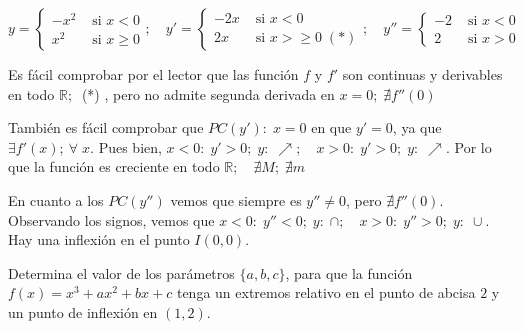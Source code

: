 	\begin{proofw}\renewcommand{\qedsymbol}{$\diamond$}
	
	$y=\begin{cases}	
	 -x^2 & \mbox{ si } x<0 \\
	 x^2	& \mbox{ si } x\ge 0
	\end{cases}; \quad 
	y'=\begin{cases}	
	 -2x & \mbox{ si } x<0 \\
	 2x	& \mbox{ si } x>\ge 0 \; (*)
	\end{cases}; \quad
	y''=\begin{cases}	
	 -2 & \mbox{ si } x<0 \\
	 2	& \mbox{ si } x>0
	\end{cases}$
	
	Es fácil comprobar por el lector que las función $f$ y $f'$ son continuas y derivables en todo $\mathbb R;\ $ (*) , pero no admite segunda derivada en $x=0 ; \; \nexists f''(0)$
	
	También es fácil comprobar que $PC(y'): \; x=0 $ en que $y'=0$, ya que $\exists f'(x);\ \forall\; x$. Pues bien, $x<0: \; y'>0; \; y: \; \nearrow; \quad x>0: \; y'>0; \; y:\; \nearrow$. Por lo que la función es creciente en todo $\mathbb R; \quad \nexists M;\; \nexists m$
	
	En cuanto a los $PC(y'')$ vemos que siempre es $y'' \neq 0$, pero $\nexists f''(0)$. Observando los signos, vemos que $x<0: \; y''<0; \; y:\; \cap; \quad x>0: \; y''>0; \; y: \; \cup$. Hay una inflexión en el punto $I(0,0)$.
	
	\end{proofw}
	
	\begin{ejre}
	Determina el valor de los parámetros $\{a,b,c\}$, para que la función $f(x)=x^3+ax^2+bx+c$	 tenga un extremos relativo en el punto de abcisa $2$ y un punto de inflexión en $(1,2)$.
	\end{ejre}

